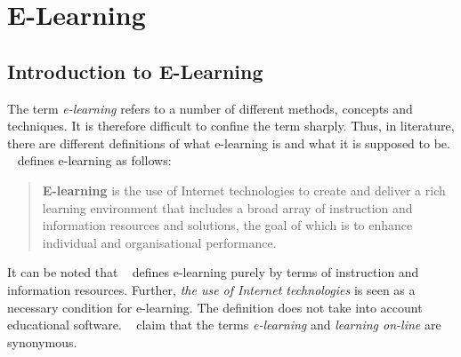 \chapter{E-Learning}
\label{chap:elearning}

\section{Introduction to E-Learning}
\label{sec:elearn:intro}

The term \emph{e-learning} refers to a number of different methods, concepts
and techniques. It is therefore difficult to confine the term sharply.
Thus, in literature, there are different definitions of what e-learning is
and what it is supposed to be.
~\citeyear{Rosenberg2006} defines e-learning as
follows:
  \begin{quote}
    \textbf{E-learning} is the use of Internet technologies to create and
    deliver a rich learning environment that includes a broad array of 
    instruction and information resources and solutions, the goal of which
    is to enhance individual and organisational performance.
  \end{quote}
It can be noted that ~\citeyear{Rosenberg2006} 
defines e-learning purely by terms of instruction and information resources. 
Further, \emph{the use of Internet technologies} is seen as a necessary 
condition for e-learning. The definition does not take into account educational 
software. ~\citeyear{Seel2009} claim that the terms
\emph{e-learning} and \emph{learning on-line} are synonymous.

